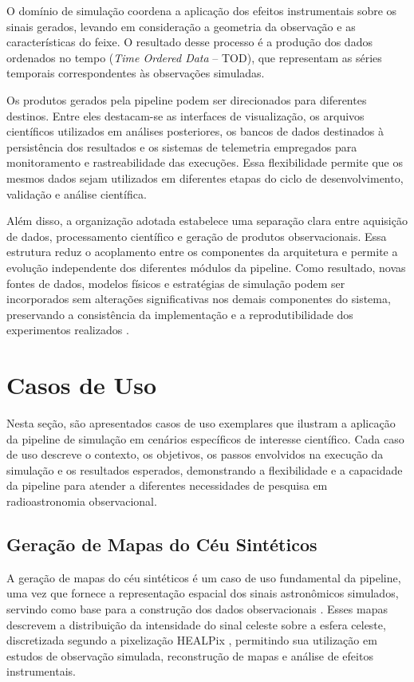 O domínio de simulação coordena a aplicação dos efeitos instrumentais sobre os sinais gerados, levando em consideração a geometria da observação e as características do feixe. O resultado desse processo é a produção dos dados ordenados no tempo (\textit{Time Ordered Data} -- TOD), que representam as séries temporais correspondentes às observações simuladas.

Os produtos gerados pela pipeline podem ser direcionados para diferentes destinos. Entre eles destacam-se as interfaces de visualização, os arquivos científicos utilizados em análises posteriores, os bancos de dados destinados à persistência dos resultados e os sistemas de telemetria empregados para monitoramento e rastreabilidade das execuções. Essa flexibilidade permite que os mesmos dados sejam utilizados em diferentes etapas do ciclo de desenvolvimento, validação e análise científica.

Além disso, a organização adotada estabelece uma separação clara entre aquisição de dados, processamento científico e geração de produtos observacionais. Essa estrutura reduz o acoplamento entre os componentes da arquitetura e permite a evolução independente dos diferentes módulos da pipeline. Como resultado, novas fontes de dados, modelos físicos e estratégias de simulação podem ser incorporados sem alterações significativas nos demais componentes do sistema, preservando a consistência da implementação e a reprodutibilidade dos experimentos realizados \cite{evans2003ddd, martin2008cleancode}.


\section{Casos de Uso}
 
Nesta seção, são apresentados casos de uso exemplares que ilustram a aplicação da pipeline de simulação em cenários específicos de interesse científico. Cada caso de uso descreve o contexto, os objetivos, os passos envolvidos na execução da simulação e os resultados esperados, demonstrando a flexibilidade e a capacidade da pipeline para atender a diferentes necessidades de pesquisa em radioastronomia observacional.

\subsection{Geração de Mapas do Céu Sintéticos}

A geração de mapas do céu sintéticos é um caso de uso fundamental da pipeline, uma vez que fornece a representação espacial dos sinais astronômicos simulados, servindo como base para a construção dos dados observacionais \cite{delabrouille2013psm, thorne2017pysm}. Esses mapas descrevem a distribuição da intensidade do sinal celeste sobre a esfera celeste, discretizada segundo a pixelização HEALPix \cite{gorski2005healpix}, permitindo sua utilização em estudos de observação simulada, reconstrução de mapas e análise de efeitos instrumentais.

